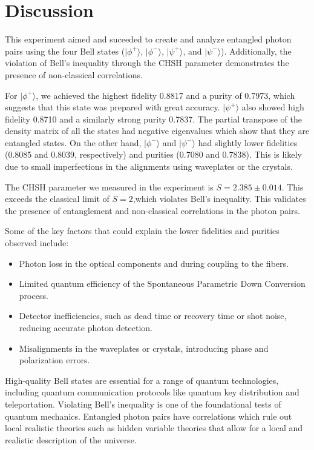 \section{Discussion}
This experiment aimed and suceeded to create and analyze entangled photon pairs using the four Bell states (\( |\phi^+\rangle \), \( |\phi^-\rangle \), \( |\psi^+\rangle \), and \( |\psi^-\rangle \)). Additionally, the violation of Bell's inequality through the CHSH parameter demonstrates the presence of non-classical correlations.

For \( |\phi^+\rangle \), we achieved the highest fidelity 0.8817 and a purity of 0.7973, which suggests that this state was prepared with great accuracy.
\( |\psi^+\rangle \) also showed high fidelity 0.8710 and a similarly strong purity 0.7837. The partial transpose of the density matrix of all the states had negative eigenvalues which show that they are entangled states.
On the other hand, \( |\phi^-\rangle \) and \( |\psi^-\rangle \) had slightly lower fidelities (0.8085 and 0.8039, respectively) and purities (0.7080 and 0.7838). This is likely due to small imperfections in the alignments using waveplates or the crystals. 

The CHSH parameter we measured in the experiment is \( S = 2.385 \pm 0.014 \). This exceeds the classical limit of \( S = 2 \),which violates Bell’s inequality. This validates the presence of entanglement and non-classical correlations in the photon pairs.

Some of the key factors that could explain the lower fidelities and purities observed include:

\begin{itemize}
    \item Photon loss in the optical components and during coupling to the fibers.
    \item Limited quantum efficiency of the Spontaneous Parametric Down Conversion process.
    \item Detector inefficiencies, such as dead time or recovery time or shot noise, reducing accurate photon detection.
    \item Misalignments in the waveplates or crystals, introducing phase and polarization errors.
\end{itemize}

High-quality Bell states  are essential for a range of quantum technologies, including quantum communication protocols like quantum key distribution and teleportation. Violating Bell's inequality is one of the foundational tests of quantum mechanics. Entangled photon pairs have correlations which rule out local realistic theories such as hidden variable theories that allow for a local and realistic description of the universe.
